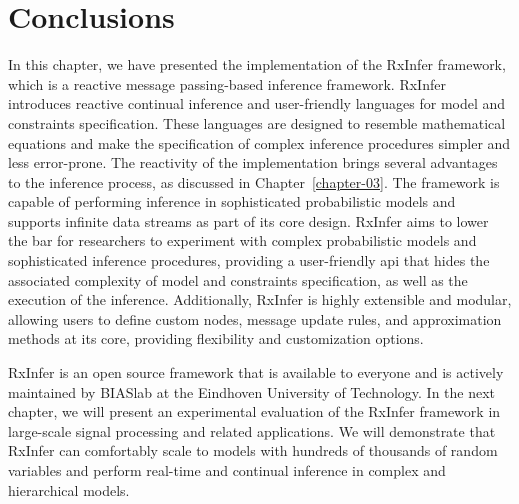 \section{Conclusions}\label{chapter-04:section:conclusion}

In this chapter, we have presented the implementation of the RxInfer framework, which is a
reactive message passing-based inference framework.
RxInfer introduces reactive continual inference and
user-friendly languages for model and constraints specification.
These languages are designed to resemble mathematical equations and make the specification of
complex inference procedures simpler and less error-prone.
The reactivity of the implementation brings several advantages to the inference process, as
discussed in Chapter~\ref{chapter-03}.
The framework is capable of performing inference in sophisticated probabilistic models and
supports infinite data streams as part of its core design.
RxInfer aims to lower the bar for researchers to experiment with complex probabilistic models
and sophisticated inference procedures, providing a user-friendly \ac{api} that hides the
associated complexity of model and constraints specification, as well as the execution of the
inference.
Additionally, RxInfer is highly extensible and modular, allowing users to define custom nodes,
message update rules, and approximation methods at its core, providing flexibility and
customization options.

RxInfer is an open source framework that is available to everyone and is actively maintained
by BIASlab at the Eindhoven University of Technology.
In the next chapter, we will present an experimental evaluation of the RxInfer framework in
large-scale signal processing and related applications.
We will demonstrate that RxInfer can comfortably scale to models with hundreds of thousands of
random variables and perform real-time and continual inference in complex and hierarchical
models.
